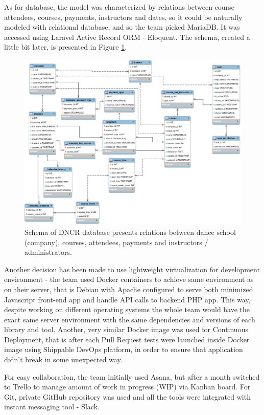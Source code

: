 \documentclass{article}
\begin{document}
As for database, the model was characterized by relations between course attendees, courses, payments, instructors and dates, so it could be naturally modeled with relational database, and so the team picked MariaDB. It was accessed using Laravel Active Record ORM - Eloquent. The schema, created a little bit later, is presented in Figure \ref{fig:schema}.

\begin{figure}[h]
    \includegraphics[width=\textwidth]{schema}
    \caption{Schema of DNCR database presents relations between dance school (company), courses, attendees, payments and instructors / administrators.}
    \label{fig:schema}
\end{figure}

Another decision has been made to use lightweight virtualization for development environment - the team used Docker containers to achieve same environment as on their server, that is Debian with Apache configured to serve both minimized Javascript front-end app and handle API calls to backend PHP app. This way, despite working on different operating systems  the whole team would have the exact same server environment with the same dependencies and versions of each library and tool. Another, very similar Docker image was used for Continuous Deployment, that is after each Pull Request tests were launched inside Docker image using Shippable DevOps platform, in order to ensure that application didn't break in some unexpected way.

For easy collaboration, the team initially used Asana, but after a month switched to Trello to manage amount of work in progress (WIP) via Kanban board. For Git, private GitHub repository was used and all the tools were integrated with instant messaging tool - Slack.
\end{document}
